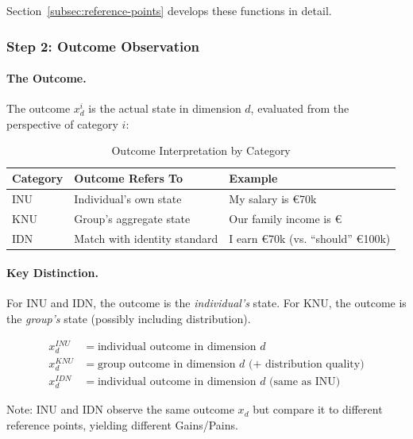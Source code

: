 Section~\ref{subsec:reference-points} develops these functions in detail.

\subsubsection{Step 2: Outcome Observation}

\paragraph{The Outcome.}
The outcome $x^i_d$ is the actual state in dimension $d$, evaluated from 
the perspective of category $i$:

\begin{table}[htbp]
\centering
\caption{Outcome Interpretation by Category}
\label{tab:outcome-interpretation}
\renewcommand{\arraystretch}{1.3}
\begin{tabular}{@{}lll@{}}
\toprule
\textbf{Category} & \textbf{Outcome Refers To} & \textbf{Example} \\
\midrule
INU & Individual's own state & My salary is \euro{70k} \\
KNU & Group's aggregate state & Our family income is \euro{90k \\
IDN & Match with identity standard & I earn \euro{70k} (vs. ``should'' \euro{100k}) \\
\bottomrule
\end{tabular}
\end{table}

\paragraph{Key Distinction.}
For INU and IDN, the outcome is the \emph{individual's} state.
For KNU, the outcome is the \emph{group's} state (possibly including distribution).

\begin{align}
x^{INU}_d &= \text{individual outcome in dimension } d \\
x^{KNU}_d &= \text{group outcome in dimension } d \text{ (+ distribution quality)} \\
x^{IDN}_d &= \text{individual outcome in dimension } d \text{ (same as INU)}
\end{align}

Note: INU and IDN observe the same outcome $x_d$ but compare it to 
different reference points, yielding different Gains/Pains.

